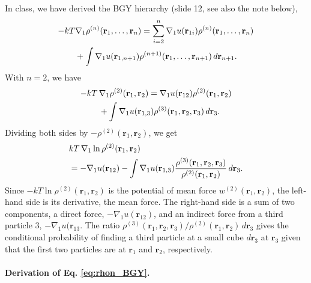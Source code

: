 \documentclass[twocolumn, 10pt]{article}
\numberwithin{equation}{section}
\newenvironment{solution}[1][\empty]
{\par\medskip\sffamily
  \textbf{\ifx\empty#1{Solution.}\relax\else{#1}\fi} \ignorespaces}
{\medskip}
\begin{document}
\begin{solution}
In class, we have derived the BGY hierarchy (slide 12, see also the note below),
\begin{align}
  -kT &\nabla_1\rho^{(n)}(\mathbf r_1, \dots, \mathbf r_n)
  =
  \sum_{i=2}^n \nabla_1 u(\mathbf r_{1i})
  \rho^{(n)}(\mathbf r_1, \dots, \mathbf r_n)
  \notag
  \\
  &+ \int
  \nabla_1 u(\mathbf r_{1, n+1})
  \rho^{(n+1)}(\mathbf r_1, \dots, \mathbf r_{n+1}) \,
  d\mathbf r_{n+1}
  .
  \label{eq:rhon_BGY}
\end{align}
%
With $n = 2$, we have
\begin{align}
  -kT \, & \nabla_1\rho^{(2)}(\mathbf r_1, \mathbf r_2)
  =
  \nabla_1 u(\mathbf r_{12})
  \rho^{(2)}(\mathbf r_1, \mathbf r_2)
  \notag \\
  &+
  \int
  \nabla_1 u(\mathbf r_{1, 3})
  \rho^{(3)}(\mathbf r_1, \mathbf r_2, \mathbf r_{3}) \,
  d\mathbf r_3
  .
  \notag
\end{align}
%
Dividing both sides by $-\rho^{(2)}(\mathbf r_1, \mathbf r_2)$, we get
\begin{align}
  &kT \, \nabla_1 \ln \rho^{(2)}(\mathbf r_1, \mathbf r_2)
  \notag \\
  &=
  -\nabla_1 u(\mathbf r_{12})
  -
  \int
  \nabla_1 u(\mathbf r_{1, 3})
    \frac{
      \rho^{(3)}(\mathbf r_1, \mathbf r_2, \mathbf r_{3})
    }{
      \rho^{(2)}(\mathbf r_1, \mathbf r_2)
    }
    \,
    d\mathbf r_3
  .
  \label{eq:BGY2a}
\end{align}
%
Since $-kT\ln\rho^{(2)}(\mathbf r_1, \mathbf r_2)$
is the potential of mean force
$w^{(2)}(\mathbf r_1, \mathbf r_2)$,
the left-hand side is its derivative, the mean force.
%
The right-hand side is a sum of two components,
a direct force, $-\nabla_1 u(\mathbf r_{12})$,
and an indirect force
from a third particle $3$, $-\nabla_1 u(\mathbf r_{13}$.
%
The ratio
$\rho^{(3)}(\mathbf r_1, \mathbf r_2, \mathbf r_3)/\rho^{(2)}(\mathbf r_1, \mathbf r_2) \, d\mathbf r_3$
gives the conditional probability of finding a third particle at
a small cube $d\mathbf r_3$ at $\mathbf r_3$
given that the first two particles are at $\mathbf r_1$ and $\mathbf r_2$, respectively.


\paragraph*{Derivation of Eq. \eqref{eq:rhon_BGY}.}


\end{solution}
\end{document}
